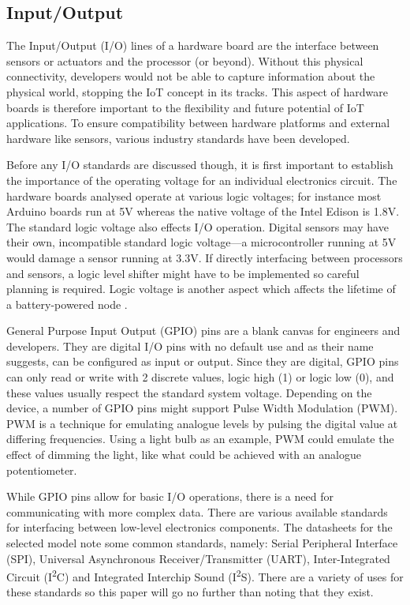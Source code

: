     \subsection{Input/Output}
    \label{section:io}
      The Input/Output (I/O) lines of a hardware board are the interface between sensors or actuators and the processor (or beyond). Without this physical connectivity, developers would not be able to capture information about the physical world, stopping the IoT concept in its tracks. This aspect of hardware boards is therefore important to the flexibility and future potential of IoT applications. To ensure compatibility between hardware platforms and external hardware like sensors, various industry standards have been developed.

      Before any I/O standards are discussed though, it is first important to establish the importance of the operating voltage for an individual electronics circuit. The hardware boards analysed operate at various logic voltages; for instance most Arduino boards run at 5V whereas the native voltage of the Intel Edison is 1.8V. The standard logic voltage also effects I/O operation. Digital sensors may have their own, incompatible standard logic voltage---a microcontroller running at 5V would damage a sensor running at 3.3V. If directly interfacing between processors and sensors, a logic level shifter might have to be implemented so careful planning is required. Logic voltage is another aspect which affects the lifetime of a battery-powered node \citep{wsnpower:2010}.

      General Purpose Input Output (GPIO) pins are a blank canvas for engineers and developers. They are digital I/O pins with no default use and as their name suggests, can be configured as input or output. Since they are digital, GPIO pins can only read or write with 2 discrete values, logic high (1) or logic low (0), and these values usually respect the standard system voltage. Depending on the device, a number of GPIO pins might support Pulse Width Modulation (PWM). PWM is a technique for emulating analogue levels by pulsing the digital value at differing frequencies. Using a light bulb as an example, PWM could emulate the effect of dimming the light, like what could be achieved with an analogue potentiometer.

      While GPIO pins allow for basic I/O operations, there is a need for communicating with more complex data. There are various available standards for interfacing between low-level electronics components. The datasheets for the selected model note some common standards, namely: Serial Peripheral Interface (SPI), Universal Asynchronous Receiver/Transmitter (UART), Inter-Integrated Circuit (I\textsuperscript{2}C) and Integrated Interchip Sound (I\textsuperscript{2}S). There are a variety of uses for these standards so this paper will go no further than noting that they exist.

